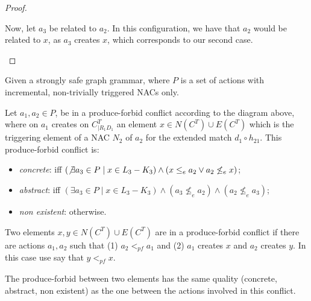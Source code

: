 \begin{proof}
\begin{description}[style=nextline,leftmargin=*]

Now, let $a_3$ be related to $a_2$. In this configuration, we have that $a_2$ would be related to $x$, as $a_3$ creates $x$, which corresponds to our second case.
\end{description}
\end{proof}

\begin{definition}\label{def:produce-forbid-strong} Given \doublyTypedGraphGrammarCore{} a strongly safe graph grammar, where $P$ is a set of actions with incremental, non-trivially triggered NACs only.

\hfill

  Let $a_1,a_2 \in P$, be in a produce-forbid conflict according to the diagram above, where on $a_1$ creates on $C^T_{|R_1D_1}$ an element $x \in N(C^T) \cup E(C^T)$ which is the triggering element of a NAC $N_2$ of $a_2$ for the extended match $d_1 \circ h_{21}$. This produce-forbid conflict is:

\begin{itemize}
  \item \emph{concrete}: iff $(\not\exists a_3 \in P \mid x \in L_3 - K_3) \land (x \leq_e a_2 \lor a_2 \not\leq_e x)$; %
  \item \emph{abstract}: iff $(\exists a_3 \in P \mid x \in L_3 - K_3) \land (a_3 \not\leq_e a_2) \land (a_2 \not\leq_e a_3)$;
  \item \emph{non existent}: otherwise.
\end{itemize}

  Two elements $x, y \in N(C^T) \cup E(C^T)$ are in a produce-forbid conflict if there are actions $a_1,a_2$ such that (1) $a_2 <_{pf} a_1$ and (2) $a_1$ creates $x$ and $a_2$ creates $y$. In this case use say that $y <_{pf} x$.

  The produce-forbid between two elements has the same quality (concrete, abstract, non existent) as the one between the actions involved in this conflict.
\end{definition}

